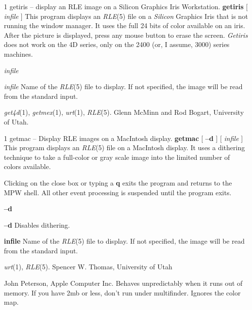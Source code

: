 %
%
%
 1
getiris -- display an RLE image on a Silicon Graphics Iris Workstation.
{\bf getiris}
[
{\it infile}
]
This program displays an
{\it RLE}{\rm (5)}
file on a
{\it Silicon} Graphics Iris
that is not running the 
window manager.  It uses the full 24 bits of color available on an iris.
After the picture is displayed, press any mouse button to erase the screen.
{\it Getiris}
does not work on the 4D series, only on the 2400 (or, I assume, 3000) series
machines.
\begin{TPlist}{{\it infile}}
\item[{{\it infile}}]
Name of the
{\it RLE}{\rm (5)}
file to display.  If not specified, the image will be read from the
standard input.
\end{TPlist}
{\it get4d}{\rm (1),}
{\it getmex}{\rm (1),}
{\it urt}{\rm (1),}
{\it RLE}{\rm (5).}
Glenn McMinn and Rod Bogart, University of Utah.
\newpage


%
%
%
 1
getmac -- Display RLE images on a MacIntosh display.
{\bf getmac}
[
{\bf --d}
] [ 
{\it infile}
]
This program displays an
{\it RLE}{\rm (5)}
file on a MacIntosh display.
It uses a dithering technique to take a
full-color or gray scale image into the limited number of colors
available.

Clicking on the close box or typing a
{\bf q}
exits the program and returns to the MPW shell.  All other event
processing is suspended until the program exits.
\begin{TPlist}{{\bf --d}}
\item[{{\bf --d}}]
Disables dithering.
\item[{{\bf infile}}]
Name of the
{\it RLE}{\rm (5)}
file to display.  If not specified, the image will be read from the
standard input.
\end{TPlist}
{\it urt}{\rm (1),}
{\it RLE}{\rm (5).}
Spencer W. Thomas, University of Utah
\par
John Peterson, Apple Computer Inc.
Behaves unpredictably when it runs out of memory.
If you have 2mb or less, don't run under multifinder.
Ignores the color map.
\newpage


